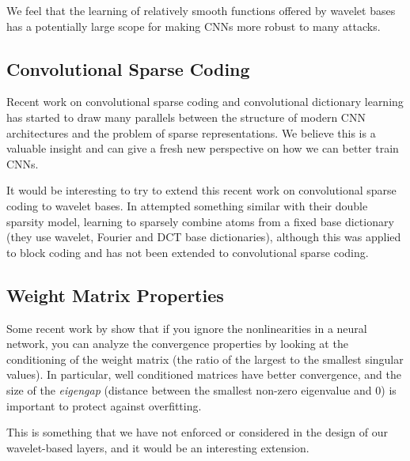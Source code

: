 We feel that the learning of relatively smooth functions offered by wavelet bases has a potentially
large scope for making CNNs more robust to many attacks.

\subsection{Convolutional Sparse Coding}
Recent work on convolutional sparse coding and convolutional
dictionary learning \cite{liu_online_2017, liu_first_2018,
papyan_convolutional_2017-1, papyan_convolutional_2017, papyan_theoretical_2018}
has started to draw many parallels between the
structure of modern CNN architectures and the problem of sparse
representations. We believe this is a valuable insight and can give a fresh new
perspective on how we can better train CNNs.

It would be interesting to try to extend this recent work on
convolutional sparse coding to wavelet bases. In \cite{rubinstein_double_2010}
\citeauthor{rubinstein_double_2010} attempted something similar with their
double sparsity model, learning to sparsely combine atoms from a fixed base
dictionary (they use wavelet, Fourier and DCT base dictionaries), although this
was applied to block coding and has not been extended to convolutional sparse coding.

\subsection{Weight Matrix Properties}
Some recent work by \citeauthor{advani_high-dimensional_2017}
\cite{advani_high-dimensional_2017} show that if you ignore the
nonlinearities in a neural network, you can analyze the convergence properties
by looking at the conditioning of the weight matrix (the ratio of the largest to
the smallest singular values). In particular, well conditioned matrices have
better convergence, and the size of the \emph{eigengap} (distance between the
smallest non-zero eigenvalue and 0) is important to protect against overfitting.

This is something that we have not enforced or considered in the design of our
wavelet-based layers, and it would be an interesting extension.

